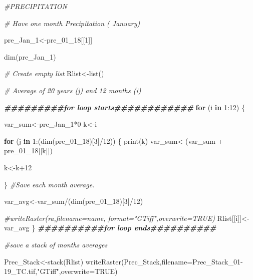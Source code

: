 \documentclass[
  10pt,
  b5paper,
]{book}
\newenvironment{Shaded}{\begin{snugshade}}{\end{snugshade}}
\newcommand{\AttributeTok}[1]{\textcolor[rgb]{0.77,0.63,0.00}{#1}}
\newcommand{\CommentTok}[1]{\textcolor[rgb]{0.56,0.35,0.01}{\textit{#1}}}
\newcommand{\ConstantTok}[1]{\textcolor[rgb]{0.00,0.00,0.00}{#1}}
\newcommand{\ControlFlowTok}[1]{\textcolor[rgb]{0.13,0.29,0.53}{\textbf{#1}}}
\newcommand{\DecValTok}[1]{\textcolor[rgb]{0.00,0.00,0.81}{#1}}
\newcommand{\DocumentationTok}[1]{\textcolor[rgb]{0.56,0.35,0.01}{\textbf{\textit{#1}}}}
\newcommand{\FunctionTok}[1]{\textcolor[rgb]{0.00,0.00,0.00}{#1}}
\newcommand{\NormalTok}[1]{#1}
\newcommand{\OtherTok}[1]{\textcolor[rgb]{0.56,0.35,0.01}{#1}}
\newcommand{\SpecialCharTok}[1]{\textcolor[rgb]{0.00,0.00,0.00}{#1}}
\newcommand{\StringTok}[1]{\textcolor[rgb]{0.31,0.60,0.02}{#1}}
\begin{document}
\begin{Shaded}
\begin{Highlighting}[]
\CommentTok{\#PRECIPITATION}


\CommentTok{\# Have one month Precipitation ( January)}

\NormalTok{pre\_Jan\_1}\OtherTok{\textless{}{-}}\NormalTok{pre\_01\_18[[}\DecValTok{1}\NormalTok{]]}

\FunctionTok{dim}\NormalTok{(pre\_Jan\_1)}

\CommentTok{\# Create empty list}
\NormalTok{Rlist}\OtherTok{\textless{}{-}}\FunctionTok{list}\NormalTok{()}


\CommentTok{\# Average of 20 years (j)  and 12 months (i) }

\DocumentationTok{\#\#\#\#\#\#\#\#\#for loop starts\#\#\#\#\#\#\#\#\#\#\#\#}
\ControlFlowTok{for}\NormalTok{ (i }\ControlFlowTok{in} \DecValTok{1}\SpecialCharTok{:}\DecValTok{12}\NormalTok{) \{ }

\NormalTok{var\_sum}\OtherTok{\textless{}{-}}\NormalTok{pre\_Jan\_1}\SpecialCharTok{*}\DecValTok{0}
\NormalTok{k}\OtherTok{\textless{}{-}}\NormalTok{i}

\ControlFlowTok{for}\NormalTok{ (j }\ControlFlowTok{in} \DecValTok{1}\SpecialCharTok{:}\NormalTok{(}\FunctionTok{dim}\NormalTok{(pre\_01\_18)[}\DecValTok{3}\NormalTok{]}\SpecialCharTok{/}\DecValTok{12}\NormalTok{)) \{}
\FunctionTok{print}\NormalTok{(k)}
\NormalTok{var\_sum}\OtherTok{\textless{}{-}}\NormalTok{(var\_sum }\SpecialCharTok{+}\NormalTok{ pre\_01\_18[[k]])}

\NormalTok{k}\OtherTok{\textless{}{-}}\NormalTok{k}\SpecialCharTok{+}\DecValTok{12}

\NormalTok{\}}
\CommentTok{\#Save each month average. }

\NormalTok{var\_avg}\OtherTok{\textless{}{-}}\NormalTok{var\_sum}\SpecialCharTok{/}\NormalTok{(}\FunctionTok{dim}\NormalTok{(pre\_01\_18)[}\DecValTok{3}\NormalTok{]}\SpecialCharTok{/}\DecValTok{12}\NormalTok{)}

\CommentTok{\#writeRaster(ra,filename=name, format="GTiff",overwrite=TRUE)}
\NormalTok{Rlist[[i]]}\OtherTok{\textless{}{-}}\NormalTok{var\_avg}
\NormalTok{\}}
\DocumentationTok{\#\#\#\#\#\#\#\#\#\#for loop ends\#\#\#\#\#\#\#\#\#\#}

\CommentTok{\#save a stack of months averages}

\NormalTok{Prec\_Stack}\OtherTok{\textless{}{-}}\FunctionTok{stack}\NormalTok{(Rlist)}
\FunctionTok{writeRaster}\NormalTok{(Prec\_Stack,}\AttributeTok{filename=}\StringTok{\textquotesingle{}Prec\_Stack\_01{-}19\_TC.tif\textquotesingle{}}\NormalTok{,}\StringTok{"GTiff"}\NormalTok{,}\AttributeTok{overwrite=}\ConstantTok{TRUE}\NormalTok{)}



\end{Highlighting}
\end{Shaded}
\end{document}
